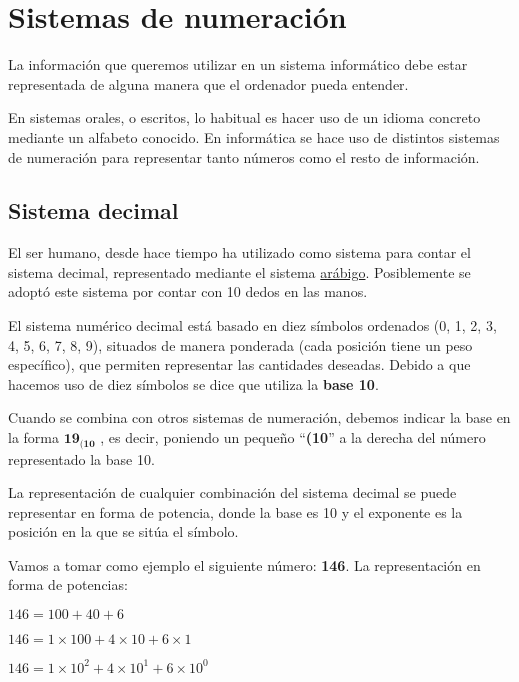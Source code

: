 \chapter{Sistemas de numeración}
La información que queremos utilizar en un sistema informático debe estar representada de alguna manera que el ordenador pueda entender.

En sistemas orales, o escritos, lo habitual es hacer uso de un idioma concreto mediante un alfabeto conocido. En informática se hace uso de distintos sistemas de numeración para representar tanto números como el resto de información.

\section{Sistema decimal}
El ser humano, desde hace tiempo ha utilizado como sistema para contar el sistema decimal, representado mediante el sistema \href{https://es.wikipedia.org/wiki/N%C3%BAmeros_ar%C3%A1bigos}{arábigo}. Posiblemente se adoptó este sistema por contar con 10 dedos en las manos.

El sistema numérico decimal está basado en diez símbolos ordenados (0, 1, 2, 3, 4, 5, 6, 7, 8, 9), situados de manera ponderada (cada posición tiene un peso específico), que permiten representar las cantidades deseadas. Debido a que hacemos uso de diez símbolos se dice que utiliza la \textbf{base 10}.

Cuando se combina con otros sistemas de numeración, debemos indicar la base en la forma $ \mathbf{19_{(10}} $ , es decir, poniendo un pequeño “\textbf{(10}” a la derecha del número representado la base 10.

La representación de cualquier combinación del sistema decimal se puede representar en forma de potencia, donde la base es 10 y el exponente es la posición en la que se sitúa el símbolo.

Vamos a tomar como ejemplo el siguiente número: \textbf{146}. La representación en forma de potencias:

\begin{center}
    \vspace{-10pt}
    $ 146 = 100+40+6 $

    $ 146 = 1\times100 + 4\times10 + 6\times1 $

    $ 146 =1\times10^2 + 4\times10^1 + 6\times10^0 $
\end{center}

